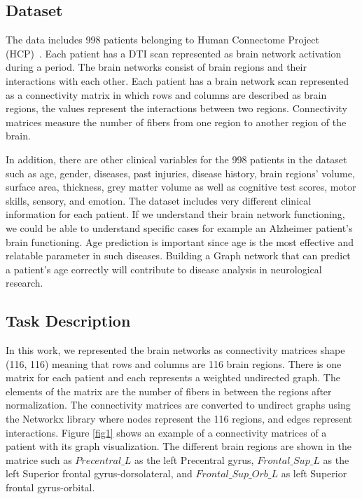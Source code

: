 \documentclass[runningheads]{llncs}
\begin{document}
\subsection{Dataset}
The data includes 998 patients belonging to Human Connectome Project (HCP)~\cite{dataset_info1}. Each patient has a DTI scan represented as brain network activation during a period. The brain networks consist of brain regions and their interactions with each other. Each patient has a brain network scan represented as a connectivity matrix in which rows and columns are described as brain regions, the values represent the interactions between two regions. Connectivity matrices measure the number of fibers from one region to another region of the brain. 

In addition, there are other clinical variables for the 998 patients in the dataset such as age, gender, diseases, past injuries, disease history, brain regions' volume, surface area, thickness, grey matter volume as well as cognitive test scores, motor skills, sensory, and emotion. The dataset includes very different clinical information for each patient. If we understand their brain network functioning, we could be able to understand specific cases for example an Alzheimer patient's brain functioning. Age prediction is important since age is the most effective and relatable parameter in such diseases\cite{kaufmann2019common}. Building a Graph network that can predict a patient's age correctly will contribute to disease analysis in neurological research.

\subsection{Task Description}
In this work, we represented the brain networks as connectivity matrices shape (116, 116) meaning that rows and columns are 116 brain regions. There is one matrix for each patient and each represents a weighted undirected graph. The elements of the matrix are the number of fibers in between the regions after normalization. The connectivity matrices are converted to undirect graphs using the Networkx library\cite{Networkx} where nodes represent the 116 regions, and edges represent interactions. Figure \ref{fig1} shows an example of a connectivity matrices of a patient with its graph visualization. The different brain regions are shown in the matrice such as $Precentral\_L$	as the left Precentral gyrus, $Frontal\_Sup\_L$ as the left Superior frontal gyrus-dorsolateral, and 
$Frontal\_Sup\_Orb\_L$	as left Superior frontal gyrus-orbital.
\end{document}
